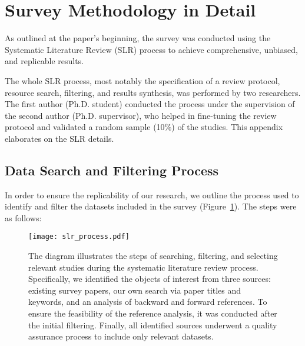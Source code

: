 
\section{Survey Methodology in Detail}
\label{asec:survey_methodology}

As outlined at the paper's beginning, the survey was conducted using the Systematic Literature Review (SLR) process to achieve comprehensive, unbiased, and replicable results.

The whole SLR process, most notably the specification of a review protocol, resource search, filtering, and results synthesis, was performed by two researchers. The first author (Ph.D. student) conducted the process under the supervision of the second author (Ph.D. supervisor), who helped in fine-tuning the review protocol and validated a random sample (10\%) of the studies. This appendix elaborates on the SLR details.

\subsection{Data Search and Filtering Process}
\label{assec:meth_search_criteria}

In order to ensure the replicability of our research, we outline the process used to identify and filter the datasets included in the survey (Figure~\ref{fig:slr_process}). The steps were as follows:

\begin{figure}[t]
    \centering
    \texttt{[image: slr\_process.pdf]}
    \vspace*{-0.5em}
    \caption{The diagram illustrates the steps of searching, filtering, and selecting relevant studies during the systematic literature review process. Specifically, we identified the objects of interest from three sources: existing survey papers, our own search via paper titles and keywords, and an analysis of backward and forward references. To ensure the feasibility of the reference analysis, it was conducted after the initial filtering. Finally, all identified sources underwent a quality assurance process to include only relevant datasets.}
    \label{fig:slr_process}
\end{figure}

